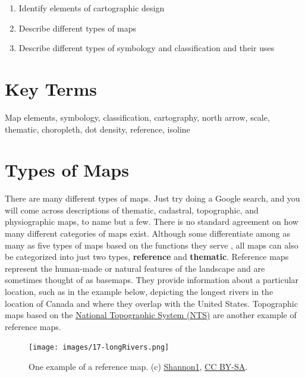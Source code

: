 \documentclass[
]{book}
\providecommand{\tightlist}{%
  \setlength{\itemsep}{0pt}\setlength{\parskip}{0pt}}
\begin{document}
\begin{enumerate}
\def\labelenumi{\arabic{enumi}.}
\tightlist
\item
  Identify elements of cartographic design
\item
  Describe different types of maps
\item
  Describe different types of symbology and classification and their uses
\end{enumerate}

\hypertarget{key-terms-16}{%
\section*{Key Terms}\label{key-terms-16}}

Map elements, symbology, classification, cartography, north arrow, scale, thematic, choropleth, dot density, reference, isoline

\hypertarget{types-of-maps}{%
\section{Types of Maps}\label{types-of-maps}}

There are many different types of maps. Just try doing a Google search, and you will come across descriptions of thematic, cadastral, topographic, and physiographic maps, to name but a few. There is no standard agreement on how many different categories of maps exist. Although some differentiate among as many as five types of maps based on the functions they serve \citep{icsm_types_2021}, all maps can also be categorized into just two types, \textbf{reference} and \textbf{thematic}. Reference maps represent the human-made or natural features of the landscape and are sometimes thought of as basemaps. They provide information about a particular location, such as in the example below, depicting the longest rivers in the location of Canada and where they overlap with the United States. Topographic maps based on the \href{https://www.nrcan.gc.ca/earth-sciences/geography/topographic-information/maps/national-topographic-system-maps/9767}{National Topographic System (NTS)} are another example of reference maps.

\begin{figure}
\centering
\texttt{[image: images/17-longRivers.png]}
\caption{One example of a reference map. \citep{shannon1_longest_2017} (c) \href{https://en.wikipedia.org/wiki/User:Shannon1}{Shannon1}, \href{https://creativecommons.org/licenses/by-sa/4.0/}{CC BY-SA}.}
\end{figure}
\end{document}
